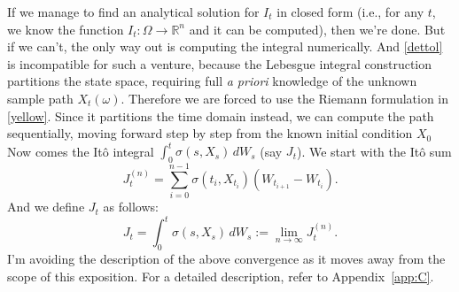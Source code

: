\documentclass[11pt]{amsart}
\theoremstyle{plain}
\theoremstyle{definition}
\theoremstyle{remark}
\numberwithin{equation}{section}
\begin{document}
If we manage to find an analytical solution for $I_t$ in closed form (i.e., for any $t$, we know the function $I_t:\Omega \to \mathbb{R}^n$ and it can be computed), then we're done. But if we can't, the only way out is computing the integral numerically. And \eqref{dettol} is incompatible for such a venture, because the Lebesgue integral construction partitions the state space, requiring full \textit{a priori} knowledge of the unknown sample path $X_t(\omega)$. Therefore we are forced to use the Riemann formulation in \eqref{yellow}. Since it partitions the time domain instead, we can compute the path sequentially, moving forward step by step from the known initial condition $X_0$ \\

Now comes the It\^{o} integral $\int_0^t \sigma(s, X_s)\,dW_s$ (say $J_t$). We start with the It\^{o} sum
\begin{equation}
    J_t^{(n)} = \sum_{i=0}^{n-1} \sigma(t_i, X_{t_i})(W_{t_{i+1}} - W_{t_i}).
\end{equation}
And we define $J_t$ as follows:
\begin{equation} 
    J_t = \int_0^t \sigma(s, X_s)\,dW_s := \lim_{n \to \infty} J_t^{(n)}.
\end{equation}    
I'm avoiding the description of the above convergence as it moves away from the scope of this exposition. For a detailed description, refer to Appendix~\ref{app:C}.\\
\end{document}
